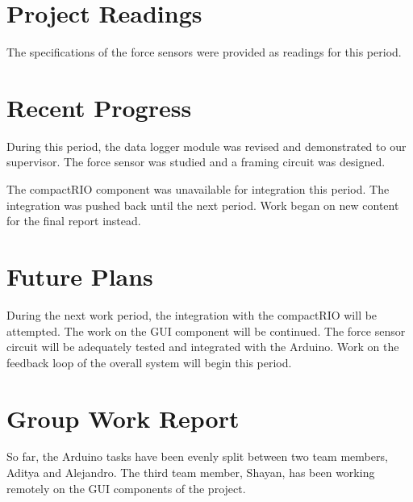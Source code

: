 \documentclass[12pt]{article}
\begin{document}
\section*{Project Readings}
The specifications of the force sensors were provided as readings for this 
period. 

\section*{Recent Progress}
During this period, the data logger module was revised and demonstrated to our
supervisor. The force sensor was studied and a framing circuit was designed. 

The compactRIO component was unavailable for integration this period. The
integration was pushed back until the next period. Work began on new content 
for the final report instead.

\section*{Future Plans}
During the next work period, the integration with the compactRIO will be 
attempted. The work on the GUI component will be continued. The force sensor 
circuit will be adequately tested and integrated with the Arduino. Work on 
the feedback loop of the overall system will begin this period.

\section*{Group Work Report}
So far, the Arduino tasks have been evenly split between two team members, 
Aditya and Alejandro. The third team member, Shayan, has been working remotely
on the GUI components of the project.
\end{document}
